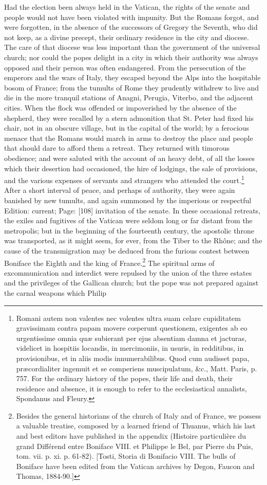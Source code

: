 Had the election been always held in the Vatican, the rights of the senate and people would not have been violated with impunity. But the Romans forgot, and were forgotten, in the absence of the successors of Gregory the Seventh, who did not keep, as a divine precept, their ordinary residence in the city and diocese. The care of that diocese was less important than the government of the universal church; nor could the popes delight in a city in which their authority was always opposed and their person was often endangered. From the persecution of the emperors and the wars of Italy, they escaped beyond the Alps into the hospitable bosom of France; from the tumults of Rome they prudently withdrew to live and die in the more tranquil stations of Anagni, Perugia, Viterbo, and the adjacent cities. When the flock was offended or impoverished by the absence of the shepherd, they were recalled by a stern admonition that St. Peter had fixed his chair, not in an obscure village, but in the capital of the world; by a ferocious menace that the Romans would march in arms to destroy the place and people that should dare to afford them a retreat. They returned with timorous obedience; and were saluted with the account of an heavy debt, of all the losses which their desertion had occasioned, the hire of lodgings, the sale of provisions, and the various expenses of servants and strangers who attended the court.\footnote{Romani autem non valentes nec volentes ultra suam celare cupiditatem gravissimam contra papam movere cœperunt questionem, exigentes ab eo urgentissime omnia quæ subierant per ejus absentiam damna et jacturas, videlicet in hospitiis locandis, in mercimoniis, in usuris, in redditibus, in provisionibus, et in aliis modis innumerabilibus. Quod cum audisset papa, præcordialiter ingemuit et se comperiens muscipulatum, \&c., Matt. Paris, p. 757. For the ordinary history of the popes, their life and death, their residence and absence, it is enough to refer to the ecclesiastical annalists, Spondanus and Fleury.} After a short interval of peace, and perhaps of authority, they were again banished by new tumults, and again summoned by the imperious or respectful Edition: current; Page: [108] invitation of the senate. In these occasional retreats, the exiles and fugitives of the Vatican were seldom long or far distant from the metropolis; but in the beginning of the fourteenth century, the apostolic throne was transported, as it might seem, for ever, from the Tiber to the Rhône; and the cause of the transmigration may be deduced from the furious contest between Boniface the Eighth and the king of France.\footnote{Besides the general historians of the church of Italy and of France, we possess a valuable treatise, composed by a learned friend of Thuanus, which his last and best editors have published in the appendix (Histoire particulière du grand Différend entre Boniface VIII. et Philippe le Bel, par Pierre du Puis, tom. vii. p. xi. p. 61-82). [Tosti, Storia di Bonifacio VIII. The bulls of Boniface have been edited from the Vatican archives by Degon, Faucon and Thomas, 1884-90.]} The spiritual arms of excommunication and interdict were repulsed by the union of the three estates and the privileges of the Gallican church; but the pope was not prepared against the carnal weapons which Philip 